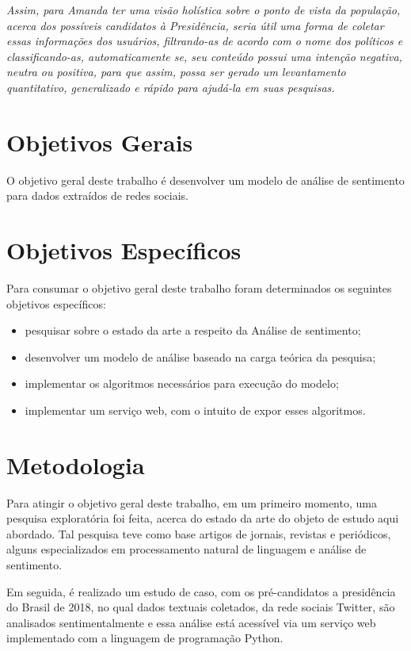 \textit{Assim, para Amanda ter uma visão holística sobre o ponto de vista da população, acerca dos possíveis candidatos à Presidência, seria útil uma forma de coletar essas informações dos usuários, filtrando-as de acordo com o nome dos políticos e classificando-as, automaticamente se, seu conteúdo possui uma intenção negativa, neutra ou positiva, para que assim, possa ser gerado um levantamento quantitativo, generalizado e rápido para ajudá-la em suas pesquisas.}

\section{Objetivos Gerais}

O objetivo geral deste trabalho é desenvolver um modelo de análise de sentimento para dados extraídos de redes sociais.

\section{Objetivos Específicos} 

Para consumar o objetivo geral deste trabalho foram determinados os seguintes objetivos específicos:

\begin{itemize}
  \item pesquisar sobre o estado da arte a respeito da Análise de sentimento;
 \item desenvolver um modelo de análise baseado na carga teórica da pesquisa;
 \item implementar os algoritmos necessários para execução do modelo;
\item implementar um serviço web, com o intuito de expor esses algoritmos. 
\end{itemize}

\section{Metodologia}

Para atingir o objetivo geral deste trabalho, em um primeiro momento, uma pesquisa exploratória foi feita, acerca do estado da arte do objeto de estudo aqui abordado. Tal pesquisa teve como base artigos de jornais, revistas e periódicos, alguns especializados em processamento natural de linguagem e análise de sentimento.

Em seguida, é realizado um estudo de caso, com os pré-candidatos a presidência do Brasil de 2018, no qual dados textuais coletados, da rede sociais Twitter, são analisados sentimentalmente e essa análise está acessível via um serviço web implementado com a linguagem de programação Python. 

